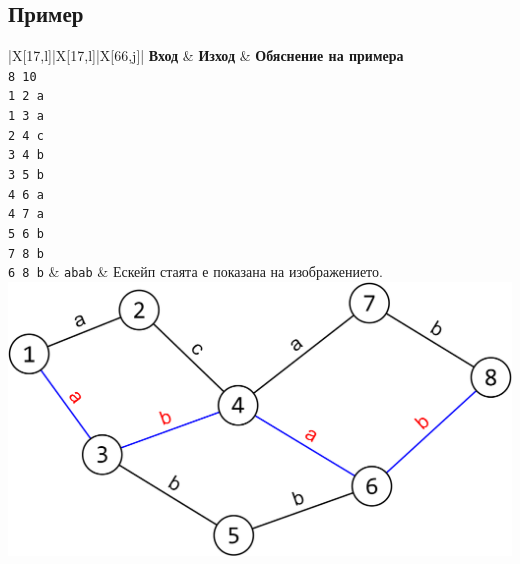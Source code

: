 \documentclass[12pt]{article}
\begin{document}
\subsection{Пример}
\begin{table}[ht]
	\begin{tblr}{|X[17,l]|X[17,l]|X[66,j]|}
		\hline
		\textbf{Вход} & \textbf{Изход} & \textbf{Обяснение на примера} \\
		\hline
		\texttt{8 10\\
                    1 2 a\\
                    1 3 a\\
                    2 4 c\\
                    3 4 b\\
                    3 5 b\\
                    4 6 a\\
                    4 7 a\\ 
                    5 6 b\\
                    7 8 b\\ 
                    6 8 b} & 
            \texttt{abab}
		& 
		{Ескейп стаята е показана на изображението.\\
		\begin{adjustbox}{width=0.55\textwidth, valign=t, center, margin=0cm 0.1cm 0cm 0.1cm}
			\includegraphics{exampleEscape.png}
		\end{adjustbox}} \\ \\
		\hline
	\end{tblr}
\end{table}
\end{document}
